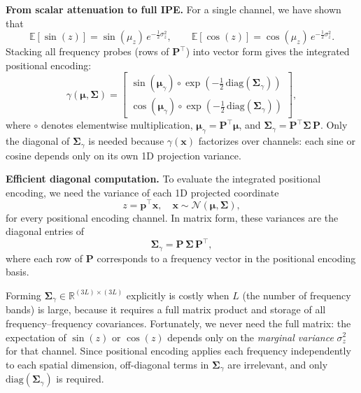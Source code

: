 \begin{enrichment}
\begin{enrichment}
    \noindent
    \textbf{From scalar attenuation to full IPE.}  
    For a single channel, we have shown that
    \[
    \mathbb{E}[\sin(z)] = \sin(\mu_z)\, e^{-\frac{1}{2}\sigma_z^2},
    \qquad
    \mathbb{E}[\cos(z)] = \cos(\mu_z)\, e^{-\frac{1}{2}\sigma_z^2}.
    \]
    Stacking all frequency probes (rows of $\mathbf{P}^\top$) into vector form gives the integrated positional encoding:
    \[
    \gamma(\boldsymbol{\mu}, \boldsymbol{\Sigma})
    = 
    \begin{bmatrix}
        \sin(\boldsymbol{\mu}_\gamma) \circ \exp\!\left(-\frac{1}{2}\,\mathrm{diag}(\boldsymbol{\Sigma}_\gamma)\right) \\
        \cos(\boldsymbol{\mu}_\gamma) \circ \exp\!\left(-\frac{1}{2}\,\mathrm{diag}(\boldsymbol{\Sigma}_\gamma)\right)
    \end{bmatrix},
    \]
    where $\circ$ denotes elementwise multiplication,  
    $\boldsymbol{\mu}_\gamma = \mathbf{P}^\top \boldsymbol{\mu}$, and  
    $\boldsymbol{\Sigma}_\gamma = \mathbf{P}^\top \boldsymbol{\Sigma}\,\mathbf{P}$.  
    Only the diagonal of $\boldsymbol{\Sigma}_\gamma$ is needed because $\gamma(\mathbf{x})$ factorizes over channels: each sine or cosine depends only on its own 1D projection variance.
    
    \medskip
    \noindent
    \textbf{Efficient diagonal computation.}  
    To evaluate the integrated positional encoding, we need the variance of each 1D projected coordinate
    \[
    z = \mathbf{p}^\top \mathbf{x}, \quad \mathbf{x} \sim \mathcal{N}(\boldsymbol{\mu}, \boldsymbol{\Sigma}),
    \]
    for every positional encoding channel. In matrix form, these variances are the diagonal entries of
    \[
    \boldsymbol{\Sigma}_\gamma = \mathbf{P} \, \boldsymbol{\Sigma} \, \mathbf{P}^\top,
    \]
    where each row of $\mathbf{P}$ corresponds to a frequency vector in the positional encoding basis.  
    
    Forming $\boldsymbol{\Sigma}_\gamma \in \mathbb{R}^{(3L) \times (3L)}$ explicitly is costly when $L$ (the number of frequency bands) is large, because it requires a full matrix product and storage of all frequency–frequency covariances. Fortunately, we never need the full matrix: the expectation of $\sin(z)$ or $\cos(z)$ depends only on the \emph{marginal variance} $\sigma_z^2$ for that channel. Since positional encoding applies each frequency independently to each spatial dimension, off-diagonal terms in $\boldsymbol{\Sigma}_\gamma$ are irrelevant, and only $\mathrm{diag}(\boldsymbol{\Sigma}_\gamma)$ is required.
    

\end{enrichment}
\end{enrichment}
